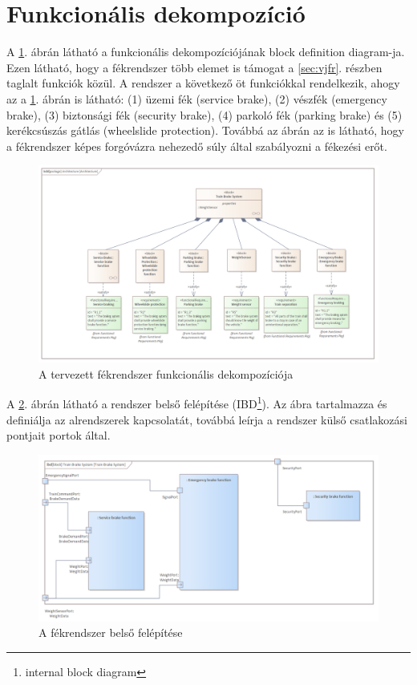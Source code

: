 \section{Funkcionális dekompozíció}
A \ref{fig:func_arch}. ábrán látható a funkcionális dekompozíciójának block definition diagram-ja.
Ezen látható, hogy a fékrendszer több elemet is támogat a \ref{sec:vjfr}. részben taglalt funkciók közül.
A rendszer a következő öt funkciókkal rendelkezik, ahogy az a \ref{fig:func_arch}. ábrán is látható: 
(1) üzemi fék (service brake), 
(2) vészfék (emergency brake), 
(3) biztonsági fék (security brake),
(4) parkoló fék (parking brake) és 
(5) kerékcsúszás gátlás (wheelslide protection).
Továbbá az ábrán az is látható, hogy a fékrendszer képes forgóvázra nehezedő súly által szabályozni a fékezési erőt.

\begin{figure}
    \footnotesize
    \centering
    \includegraphics[width=150mm, keepaspectratio]{figures/Architecture.png}
    \caption{A tervezett fékrendszer funkcionális dekompozíciója}
    \label{fig:func_arch}
\end{figure}

A \ref{fig:func_arch_ibd}. ábrán látható a rendszer belső felépítése (IBD\footnote{internal block diagram}).
Az ábra tartalmazza és definiálja az alrendszerek kapcsolatát, továbbá leírja a rendszer külső csatlakozási pontjait portok által.
\begin{figure}
    \footnotesize
    \centering
    \includegraphics[width=150mm, keepaspectratio]{figures/Architecture_ibd.png}
    \caption{A fékrendszer belső felépítése}
    \label{fig:func_arch_ibd}
\end{figure}

